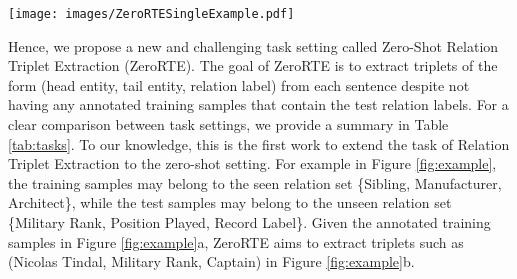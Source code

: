 \documentclass[11pt]{article}
\begin{document}
\begin{table}[!t]
    \texttt{[image: images/ZeroRTESingleExample.pdf]}
    
    \centering
   \caption{Comparison of task settings with our proposed Zero-Shot Relation Triplet Extraction (ZeroRTE). 
   To our knowledge, ZeroRTE is the first task to extract full relation triplets in the zero-shot setting.} 
    \label{tab:tasks}
\end{table} 
Hence, we propose a new and challenging task setting called Zero-Shot Relation Triplet Extraction (ZeroRTE).
The goal of ZeroRTE is to extract triplets of the form (head entity, tail entity, relation label) from each sentence despite not having any annotated training samples that contain the test relation labels. 
For a clear comparison between task settings, we provide a summary in Table \ref{tab:tasks}.
To our knowledge, this is the first work to extend the task of Relation Triplet Extraction to the zero-shot setting.
For example in Figure \ref{fig:example}, the training samples may belong to the seen relation set \{Sibling, Manufacturer, Architect\}, while the test samples may belong to the unseen relation set \{Military Rank, Position Played, Record Label\}.
Given the annotated training samples in Figure \ref{fig:example}a, ZeroRTE aims to extract triplets such as (Nicolas Tindal, Military Rank, Captain) in Figure \ref{fig:example}b.






    
\end{document}
